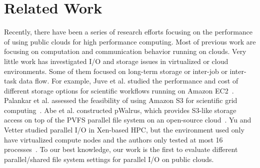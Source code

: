 \section{Related Work}
    \label{sec:related}
    Recently, there have been a series of research efforts focusing on the
    performance of using public clouds for high performance computing. Most of
    previous work are focusing on computation and communication behavior
    running on clouds. Very little work has investigated I/O and storage
    issues in virtualized or cloud environments. Some of them focused on
    long-term storage or inter-job or inter-task data flow. For example, Juve
    et al. studied the performance and cost of different storage options for
    scientific workflows running on Amazon EC2~\cite{juve:workflow-io}.
    Palankar et al. assessed the feasibility of using Amazon S3 for scientific
    grid computing~\cite{palankar:s3}. Abe et al. constructed pWalrus, which
    provides S3-like storage access on top of the PVFS parallel file system on
    an open-source cloud~\cite{abe:pfs-cloud}. Yu and Vetter studied parallel
    I/O in Xen-based HPC, but the environment used only have virtualized
    compute nodes and the authors only tested at most 16
    processes~\cite{yu:xen-hpc}. To our best knowledge, our work is the first
    to evaluate different parallel/shared file system settings for parallel
    I/O on public clouds.
